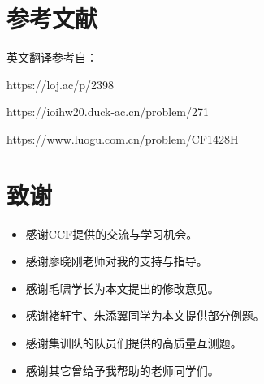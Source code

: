 \documentclass{noithesis}
\begin{document}
\section{参考文献}

英文翻译参考自：

https://loj.ac/p/2398

https://ioihw20.duck-ac.cn/problem/271

https://www.luogu.com.cn/problem/CF1428H

\section{致谢}

\begin{itemize}
	\item 感谢CCF提供的交流与学习机会。
	\item 感谢廖晓刚老师对我的支持与指导。
	\item 感谢毛啸学长为本文提出的修改意见。
	\item 感谢褚轩宇、朱添翼同学为本文提供部分例题。
	\item 感谢集训队的队员们提供的高质量互测题。
	\item 感谢其它曾给予我帮助的老师同学们。
\end{itemize}
\end{document}

